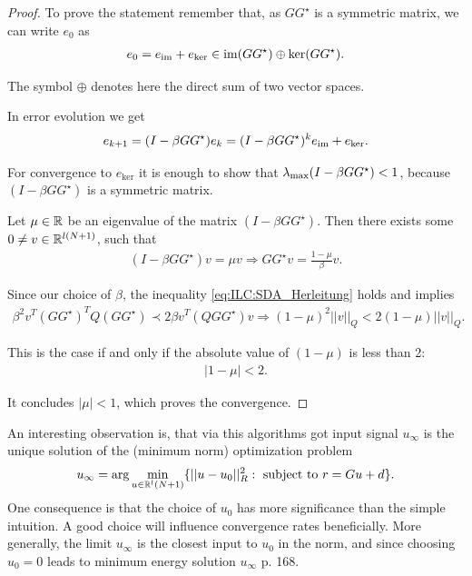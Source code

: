 \begin{proof}

To prove the statement remember that, as $GG^\star$ is a symmetric matrix, we can write $e_0$ as 
\begin{align}
e_0 = e_{\operatorname{im}} + e_{\ker} \in \operatorname{im}(G G^\star) \oplus \ker(G G^\star). 
\end{align}

The symbol $\oplus$ denotes here the direct sum of two vector spaces. 

In error evolution we get 
\begin{align}
e_{k+1} = (I - \beta G G^\star) e_k = (I - \beta G G^\star)^k e_{\operatorname{im}} + e_{\ker}.
\end{align}

For convergence to $e_{\ker}$ it is enough  to show that $\lambda_{\mathrm{max}}(I - \beta G G^\star) < 1$, because $(I - \beta G G^\star)$ is a symmetric matrix. 

Let $\mu \in {\mathbb{R}}$ be an eigenvalue of the matrix $(I - \beta G G^{\star})$. Then there exists some $0 \neq v \in {\mathbb{R}}^{l (N+1)}$, such that 
\begin{align}
	(I -\beta G G^{\star})v = \mu v \Rightarrow G G^{\star} v = \frac{1 - \mu}{\beta}v. 
\end{align}

Since our choice of $\beta$, the inequality \eqref{eq:ILC:SDA_Herleitung} holds and implies 
\begin{align}
\beta^2 v^T (G G^\star)^T Q (G G^\star) \prec 2\beta v^T(Q G G^\star)v 
\Rightarrow (1 - \mu)^2 ||v||_Q < 2 (1 - \mu) ||v||_Q. 
\end{align}

This is the case if and only if the absolute value of $(1 - \mu)$ is less than 2: 
\begin{align}
|1 - \mu| < 2. 
\end{align}

It concludes $|\mu|<1$, which proves the convergence. 
\end{proof}



An interesting observation is, that via this algorithms got input signal $u_\infty$ is the unique solution of the (minimum norm) optimization problem 
\begin{align}
u_\infty = \arg \min_{u \in {\mathbb{R}}^l(N+1)} \{|| u - u_0||_R^2: \text{ subject to } r = Gu + d\}.
\end{align}
One consequence is that the choice of $u_0$ has more significance than the simple intuition. A good choice will influence convergence rates beneficially. More generally, the limit $u_\infty$ is the closest input to $u_0$ in the norm, and since choosing $u_0 = 0$ leads to minimum energy solution $u_\infty$ \cite{ILC} p. 168. 

